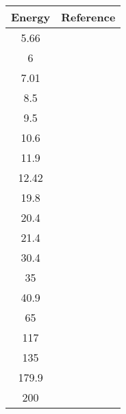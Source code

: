 \begin{tabular}{|c||c|} 
    \hline 
    \bf{Energy} & \bf{Reference} \\
    \hline
    \hline 
    5.66 & \cite{Blue1965}\\
    6 & \cite{Blue1965}\\
    7.01 & \cite{Blue1965}\\
    8.5 & \cite{Blue1965}\\
    9.5 & \cite{Blue1965}\\
    10.6 & \cite{Prior1971}\\
    11.9 & \cite{Blue1965}\\
    12.42 & \cite{Prior1971}\\
    19.8 & \cite{Karban1969}\\
    20.4 & \cite{Karban1969}\\
    21.4 & \cite{Karban1969}\\
    30.4 & \cite{Greaves1972}\\
    35 & \cite{Ohnuma1990}\\
    40.9 & \cite{Alvarez1982}\\
    65 & \cite{Sakaguchi1982}\\
    117 & \cite{Hillman1957}\\
    135 & \cite{Kelly1989}\\
    179.9 & \cite{Kelly1990}\\
    200 & \cite{Glover1985}\\
    \hline
\end{tabular}
